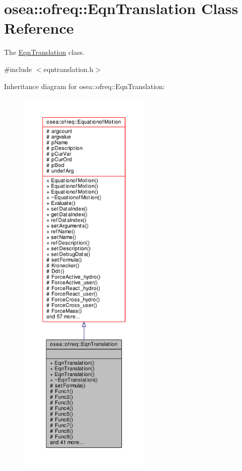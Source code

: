 \hypertarget{classosea_1_1ofreq_1_1_eqn_translation}{\section{osea\-:\-:ofreq\-:\-:Eqn\-Translation Class Reference}
\label{classosea_1_1ofreq_1_1_eqn_translation}
}


The \hyperlink{classosea_1_1ofreq_1_1_eqn_translation}{Eqn\-Translation} class.  




{\ttfamily \#include $<$eqntranslation.\-h$>$}



Inheritance diagram for osea\-:\-:ofreq\-:\-:Eqn\-Translation\-:\nopagebreak
\begin{figure}[H]
\begin{center}
\leavevmode
\includegraphics[height=550pt]{classosea_1_1ofreq_1_1_eqn_translation__inherit__graph}
\end{center}
\end{figure}
